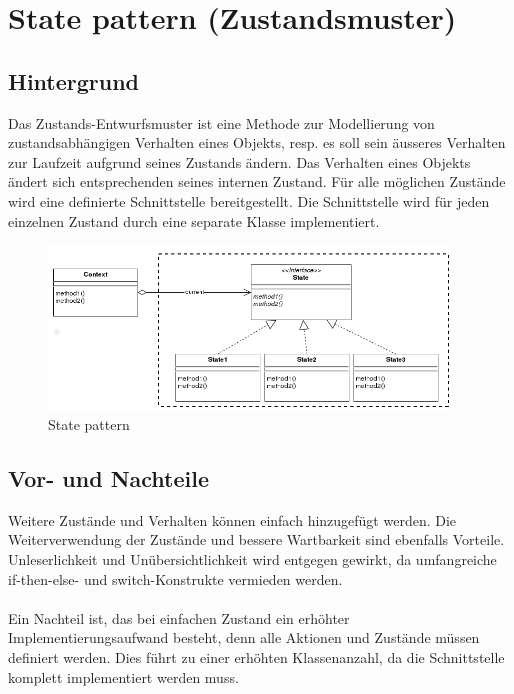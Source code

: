 \documentclass[10pt,a4paper]{article}
\begin{document}
\section*{State pattern (Zustandsmuster)}
%
\subsection*{Hintergrund}
%
Das Zustands-Entwurfsmuster ist eine Methode zur Modellierung von zustandsabhängigen Verhalten eines Objekts, resp. es soll sein äusseres Verhalten zur Laufzeit aufgrund seines Zustands ändern. Das Verhalten eines Objekts ändert sich entsprechenden seines internen Zustand. Für alle möglichen Zustände wird eine definierte Schnittstelle bereitgestellt. Die Schnittstelle wird für jeden einzelnen Zustand durch eine separate Klasse implementiert.
%
\begin{figure}[H]
  \begin{center}
    \includegraphics[width=0.95\textwidth]{state-pattern01.png}
    \caption{State pattern}
    \label{fig:state-pattern}
  \end{center}
\end{figure}
%
\subsection*{Vor- und Nachteile}
%
Weitere Zustände und Verhalten können einfach hinzugefügt werden. Die Weiterverwendung der Zustände und bessere Wartbarkeit sind ebenfalls Vorteile. Unleserlichkeit und Unübersichtlichkeit wird entgegen gewirkt, da umfangreiche if-then-else- und switch-Konstrukte vermieden werden.\\ \\
Ein Nachteil ist, das bei einfachen Zustand ein erhöhter Implementierungsaufwand besteht, denn alle Aktionen und Zustände müssen definiert werden. Dies führt zu einer erhöhten Klassenanzahl, da die Schnittstelle komplett implementiert werden muss.
%
\end{document}
